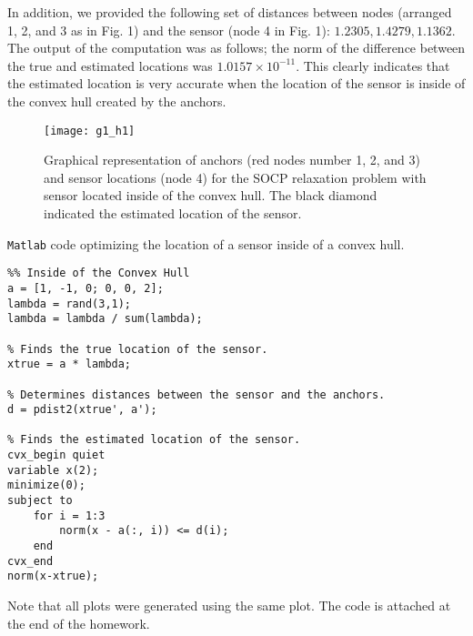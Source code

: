 \documentclass[12pt,letterpaper]{article}
\begin{document}
In addition, we provided the following set of distances between nodes (arranged 1, 2, and 3 as in Fig. 1) and the sensor (node 4 in Fig. 1): $1.2305, 1.4279, 1.1362$. The output of the computation was as follows; the norm of the difference between the true and estimated locations was $1.0157\times10^{-11}$. This clearly indicates that the estimated location is very accurate when the location of the sensor is inside of the convex hull created by the anchors. 

\begin{figure}
\begin{center}
\texttt{[image: g1\_h1]}
\end{center}
\caption{Graphical representation of anchors (red nodes number 1, 2, and 3) and sensor locations (node 4) for the SOCP relaxation problem with sensor located inside of the convex hull. The black diamond indicated the estimated location of the sensor.}
\end{figure}

\begin{center}
\texttt{Matlab} code optimizing the location of a sensor inside of a convex hull.  
\end{center}
\begin{lstlisting}
%% Inside of the Convex Hull
a = [1, -1, 0; 0, 0, 2];
lambda = rand(3,1);
lambda = lambda / sum(lambda);

% Finds the true location of the sensor.
xtrue = a * lambda; 

% Determines distances between the sensor and the anchors.
d = pdist2(xtrue', a');

% Finds the estimated location of the sensor.
cvx_begin quiet
variable x(2);
minimize(0);
subject to
    for i = 1:3
        norm(x - a(:, i)) <= d(i);
    end
cvx_end
norm(x-xtrue);
\end{lstlisting}
Note that all plots were generated using the same plot. The code is attached at the end of the homework.
~\\
\end{document}
